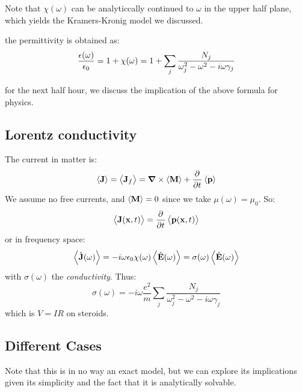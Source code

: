 Note that $\chi(\omega)$ can be analyticcally continued to $\omega$ in the upper half plane, which yields the Kramers-Kronig model we discussed.

the permittivity is obtained as:
\begin{equation}
    \frac{\epsilon(\omega)}{\epsilon_0} = 1 + \chi(\omega) = 1 + \sum_j \frac{N_j}{\omega_j^2 - \omega^2 - i\omega\gamma_j}
\end{equation}

for the next half hour, we discuss the implication of the above formula for physics.

\subsection{Lorentz conductivity}
The current in matter is:
\begin{equation}
    \avg{\v{J}} = \avg{\v{J}_f} = \nabla \times \avg{\v{M}} + \dpd{}{t}\avg{\v{p}}
\end{equation}
We assume no free currents, and $\left< \mathbf{M} \right> = 0$ since we take $\mu(\omega) = \mu_0$. So:
\begin{equation}
    \avg{\v{J}(\v{x}, t)} = \dpd{}{t}\avg{\v{p}(\v{x}, t)}
\end{equation}
or in frequency space:
\begin{equation}
    \left< \hat{\mathbf{J}}(\omega) \right> = -i\omega \epsilon_0 \chi(\omega)\left< \hat{\mathbf{E}}(\omega) \right> = \sigma(\omega)\left< \hat{\mathbf{E}}(\omega) \right> 
\end{equation}
with $\sigma(\omega)$ the \emph{conductivity}. Thus:
\begin{equation}
    \sigma(\omega) = - i\omega\frac{e^2}{m}\sum_j \frac{N_j}{\omega_j^2 - \omega^2 - i\omega \gamma_j}
\end{equation}
which is $V=IR$ on steroids. 

\subsection{Different Cases}
Note that this is in no way an exact model, but we can explore its implications given its simplicity and the fact that it is analytically solvable.

